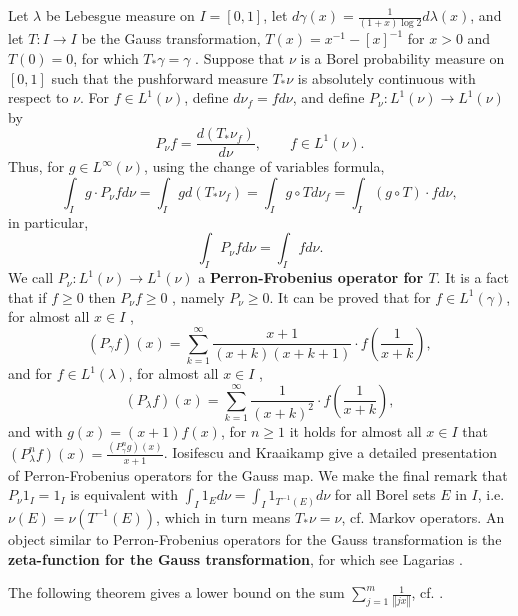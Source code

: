 \documentclass{amsart}
\newcommand{\norm}[1]{\left\Vert #1 \right\Vert}
\begin{document}
Let $\lambda$ be Lebesgue measure on $I=[0,1]$, let
$d\gamma(x) = \frac{1}{(1+x)\log 2} d\lambda(x)$, and let $T:I \to I$ be the Gauss transformation,
$T(x)=x^{-1}-[x]^{-1}$ for $x >0$ and $T(0)=0$, for which $T_*\gamma = \gamma$   \cite[p.~77, Lemma 3.5]{einsiedler}. 
Suppose that $\nu$ is a Borel probability measure on $[0,1]$ such that the pushforward measure $T_* \nu$ is absolutely continuous with respect
to $\nu$. For $f \in L^1(\nu)$,
define $d\nu_f = f d\nu$, and define
$P_\nu:L^1(\nu) \to L^1(\nu)$ by
\[
P_\nu f = \frac{d(T_* \nu_f)}{d\nu},\qquad f \in L^1(\nu).
\]
Thus, for $g \in L^\infty(\nu)$, using the change of variables formula,
\[
\int_I g \cdot P_\nu f d\nu = \int_I g d(T_* \nu_f) = 
\int_I g \circ T d\nu_f
=\int_I (g \circ T) \cdot f d\nu,
\]
in particular,
\[
\int_I P_\nu f d\nu = \int_I f d\nu.
\]
We call $P_\nu:L^1(\nu) \to L^1(\nu)$ a \textbf{Perron-Frobenius operator for $T$}. It is a fact that
if $f \geq 0$ then $P_\nu f \geq 0$ \cite[p.~57, Proposition 2.1.1]{iosifescu}, namely $P_\nu \geq 0$.
It can be proved  that for $f \in L^1(\gamma)$, for almost all $x \in I$ \cite[p.~59, Proposition 2.1.2]{iosifescu},
\[
(P_\gamma f)(x) = \sum_{k=1}^\infty \frac{x+1}{(x+k)(x+k+1)}\cdot f\left(\frac{1}{x+k}\right),
\]
and for $f \in L^1(\lambda)$, for almost all $x \in I$ \cite[p.~60, Corollary 2.1.4]{iosifescu},
\[
(P_\lambda f)(x) = \sum_{k=1}^\infty \frac{1}{(x+k)^2} \cdot f\left(\frac{1}{x+k}\right),
\]
and with $g(x)=(x+1)f(x)$, for $n \geq 1$ it holds for almost all $x \in I$ that
 $(P_\lambda^n f)(x) = \frac{(P_\gamma^n g)(x)}{x+1}$.
 Iosifescu and Kraaikamp \cite[Chapter 2]{iosifescu} give a detailed presentation of Perron-Frobenius operators for the Gauss
 map. We make the final remark that
 $P_\nu 1_I = 1_I$ is equivalent with
 $\int_I 1_E  d\nu = \int_I 1_{T^{-1}(E)} d\nu$ for all Borel sets $E$ in $I$, 
 i.e. $\nu(E) = \nu(T^{-1}(E))$, which in turn means $T_* \nu = \nu$, cf. Markov operators.
An object similar to Perron-Frobenius operators for the Gauss transformation
is the \textbf{zeta-function for the Gauss transformation}, for which see Lagarias \cite[p.~58, \S 3.3]{zetafunctions}.
 
 



The following theorem gives a lower bound on the sum $\sum_{j=1}^m \frac{1}{\norm{jx}}$, cf. \cite[p.~4, Theorem 3.1]{2007arXiv0709.2882V}.
\end{document}
